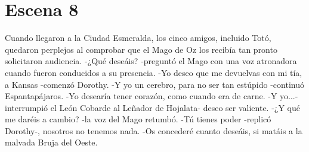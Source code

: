 \chapter{Escena 8}
Cuando llegaron a la Ciudad Esmeralda, los cinco amigos, incluido Totó, quedaron perplejos al comprobar que el Mago de Oz los recibía tan pronto solicitaron audiencia.
-¿Qué deseáis? -preguntó el Mago con una voz atronadora cuando fueron conducidos a su presencia. 
-Yo deseo que me devuelvas con mi tía, a Kansas -comenzó Dorothy.
-Y yo un cerebro, para no ser tan estúpido -continuó Espantapájaros.
-Yo desearía tener corazón, como cuando era de carne.
-Y yo...-interrumpió el León Cobarde al Leñador de Hojalata- deseo ser valiente.
-¿Y qué me daréis a cambio? -la voz del Mago retumbó.
-Tú tienes poder -replicó Dorothy-, nosotros no tenemos nada. 
-Os concederé cuanto deseáis, si matáis a la malvada Bruja del Oeste.